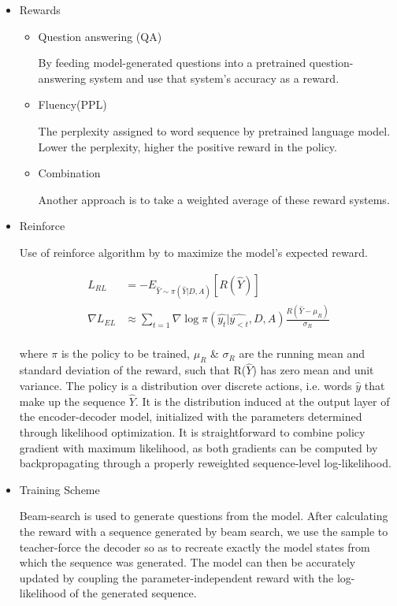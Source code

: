\documentclass[12pt,leqno,a4paper]{article}
\begin{document}
\begin{itemize}
    \item Rewards
    \begin{itemize}
        \item Question answering (QA) 
        
        By feeding model-generated questions into a pretrained question-answering system and use that system’s accuracy as a reward.
        \item Fluency(PPL)
        
        The perplexity assigned to word sequence by pretrained language model. Lower the perplexity, higher the positive reward in the policy.
        
        \item Combination
        
        Another approach is to take a weighted average of these reward systems. 
        
    \end{itemize}
    \item Reinforce
    
    Use of reinforce algorithm by \cite{Williams} to maximize the model’s expected reward.
    
    \begin{equation} \label{eq4}
    \begin{split}
        L_{RL}&=-E_{\hat{Y}\sim \pi (\hat{Y}|D, A)}[R(\hat{Y})]\\
        \nabla L_{EL}& \approx \sum_{t=1} \nabla \log \pi(\hat{y_t}|\hat{y_{<t}},D,A)\frac{R(\hat{Y}-\mu_R)}{\sigma_R} \\
\end{split}
\end{equation}

where $\pi$ is the policy to be trained, $\mu_R$ \& $\sigma_R$ are the running mean and standard deviation of the reward, such that
R($\hat{Y}$) has zero mean and unit variance.  The policy is a distribution over discrete actions, i.e. words $\hat{y}$ that make up the sequence $\hat{Y}$. It is the distribution induced at the output layer of the encoder-decoder model, initialized with the parameters determined through likelihood optimization. It is straightforward to combine policy gradient with maximum likelihood, as both gradients can be computed by backpropagating through a properly reweighted sequence-level log-likelihood.

\item Training Scheme

Beam-search is used to generate questions from the model. After calculating the reward with a sequence generated by beam search, we use the sample to teacher-force the decoder so as to recreate exactly the model states from which the sequence was generated. The model can then be accurately updated by coupling the parameter-independent reward with the log-likelihood of the generated sequence. 
\end{itemize}
\end{document}
